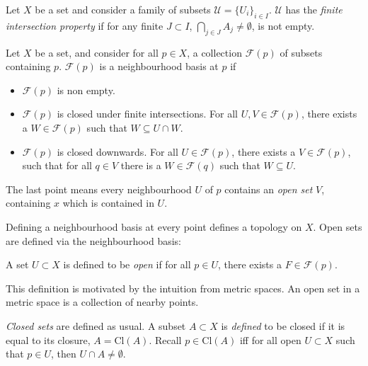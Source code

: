         \begin{defn}\label{defn:finintprop}
        Let \(X\) be a set and consider a family of subsets \( \mathcal{U} = \{U_i\}_{i \in I}\). \( \mathcal{U}\) has the \emph{finite intersection property} if for any finite \(J \subset I \), \( \bigcap_{j\in J} A_j \neq \emptyset \), is not empty.
        \end{defn}
    
        
        \begin{defn}
        Let \(X\) be a set, and consider for all \( p \in X\),  a collection \( \mathcal{F}(p)\) of subsets containing \(p\). \( \mathcal{F}(p)\) is a neighbourhood basis at \(p\) if
        \begin{itemize}
            \item \( \mathcal{F}(p)\) is non empty.
            \item \( \mathcal{F}(p)\) is closed under finite intersections. For all \(U,V \in \mathcal{F}(p)\), there exists a \(W \in \mathcal{F}(p)\) such that \( W \subseteq U \cap W\).
            \item \( \mathcal{F}(p)\) is closed downwards. For all \(U \in \mathcal{F}(p)\), there exists a \( V \in \mathcal{F}(p)\), such that for all \(q \in V\) there is a \(W \in \mathcal{F}(q)\) such that \(W \subseteq U\).
        \end{itemize}
        \end{defn}
        The last point means every neighbourhood \(U\) of \(p\) contains an \emph{open set} \(V\), containing \(x\) which is contained in \(U\).
            
        Defining a neighbourhood basis at every point defines a topology on \(X\). Open sets are defined via the neighbourhood basis:
        
        \begin{defn}[Open] A set \(U \subset X\) is defined to be \emph{open} if for all \( p \in U\), there exists a \( F \in \mathcal{F}(p)\).
        \end{defn}
        This definition is motivated by the intuition from metric spaces.
        An open set in a metric space is a collection of nearby points.
        
        \emph{Closed sets} are defined as usual. A subset \(A \subset X\) is \emph{defined} to be closed if it is equal to its closure, \( A = \mathrm{Cl}(A)\).
        Recall \( p \in \mathrm{Cl}(A) \) iff for all open \(U \subset X\) such that \(p \in U\), then \( U \cap A \neq \emptyset \).
            
